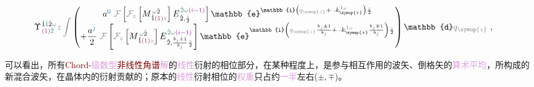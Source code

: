 \begin{subequations}
\begin{align}
		&\hspace*{-0.3em} \Upsilon^{\;\! \hat{1} \textcolor{PineGreen}{\hat{1}} \hat{2} \mathcolor{gray}{\omega} }_{\;\! \textcolor{Maroon}{(1)} \textcolor{PineGreen}{\hat{2}} } \mathcolor{gray}{z} \mathcolor{gray}{\int} \begin{pmatrix} a^{\textcolor{NavyBlue}{0}} ~ \mathcolor{gray}{\mathcal F} \left[ \mathcolor{gray}{\mathcal F_{z}} \left[ {M}^{\;\! \mathcolor{gray}{\omega} \hat{2} }_{\;\! \hat{1} \textcolor{Maroon}{(1)} \mathcolor{gray}{z} } \right] {E}^{\;\! \textcolor{PineGreen}{\hat{2}} \mathcolor{gray}{\omega} \textcolor{Plum}{(i-1)} }_{\;\! \hat{2} , \frac{ \mathcolor{gray}{z} }{ 2 }} \right] \mathbb{e}^{\mathbb{i} \left( \mathcolor{gray}{q_{\symup{z}}} + \xint{\begin{smallmatrix} ~ \\ {}^{}_{\mathcolor{gray}{-}} \\ ~ \end{smallmatrix}}{15}{k}_{\symup{z}}^{\;\! \textcolor{PineGreen}{\hat{1}} \mathcolor{gray}{\omega} } \right) \frac{ \mathcolor{gray}{z} }{ 2 }} \\ + \dfrac{a^{\textcolor{NavyBlue}{j}}}{2} ~ \mathcolor{gray}{\mathcal F} \left[ \mathcolor{gray}{\mathcal F_{z}} \left[ {M}^{\;\! \mathcolor{gray}{\omega} \hat{2} }_{\;\! \hat{1} \textcolor{Maroon}{(1)} \mathcolor{gray}{z} } \right] {E}^{\;\! \textcolor{PineGreen}{\hat{2}} \mathcolor{gray}{\omega} \textcolor{Plum}{(i-1)} }_{\;\! \hat{2} , \frac{b_{\textcolor{NavyBlue}{j}} \pm 1}{b_{\textcolor{NavyBlue}{j}}} \frac{ \mathcolor{gray}{z} }{ 2 }} \right] \mathbb{e}^{\mathbb{i} \left( \mathcolor{gray}{q_{\symup{z}}} \frac{b_{\textcolor{NavyBlue}{j}} \pm 1}{b_{\textcolor{NavyBlue}{j}}} + \xint{\begin{smallmatrix} ~ \\ {}^{}_{\mathcolor{gray}{-}} \\ ~ \end{smallmatrix}}{15}{k}_{\symup{z}}^{\;\! \textcolor{PineGreen}{\hat{1}} \mathcolor{gray}{\omega} } \frac{b_{\textcolor{NavyBlue}{j}} \mp 1}{b_{\textcolor{NavyBlue}{j}}} \right) \frac{ \mathcolor{gray}{z} }{ 2 }} \end{pmatrix} \mathbb{d} \mathcolor{gray}{q_{\symup{z}}} \label{eq:Born_approx-scalar-G-E-12-discrete-NLAST_Chord_b}~,
	\end{align}
\end{subequations}

可以看出，所有\textcolor{Maroon}{Chord}-\textcolor{Plum}{级数型}\textcolor{Maroon}{非线性角谱}\textcolor{Plum}{解}的\textcolor{Plum}{线性}\textcolor{NavyBlue}{衍射}的\textcolor{NavyBlue}{相位}部分，在某种程度上，是参与相互作用的\textcolor{PineGreen}{波矢}、\textcolor{NavyBlue}{倒格矢}的\textcolor{Plum}{算术平均}，所构成的新混合\textcolor{PineGreen}{波矢}，在\textcolor{PineGreen}{晶体}内的\textcolor{NavyBlue}{衍射}贡献的；原本的\textcolor{Plum}{线性}\textcolor{NavyBlue}{衍射相位}的\textcolor{Plum}{权重}只占约\textcolor{Plum}{一半}左右($\pm,\mp$)。

